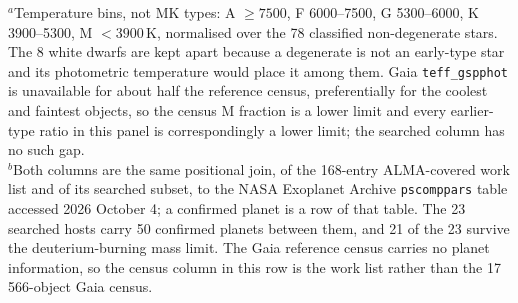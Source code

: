 \begin{table}
\smallskip
{\footnotesize $^{a}$Temperature bins, not MK types: A $\ge7500$, F 6000--7500, G 5300--6000, K 3900--5300, M $<3900$\,K, normalised over the 78 classified non-degenerate stars. The 8 white dwarfs are kept apart because a degenerate is not an early-type star and its photometric temperature would place it among them. Gaia \texttt{teff\_gspphot} is unavailable for about half the reference census, preferentially for the coolest and faintest objects, so the census M fraction is a lower limit and every earlier-type ratio in this panel is correspondingly a lower limit; the searched column has no such gap.\\ $^{b}$Both columns are the same positional join, of the 168-entry ALMA-covered work list and of its searched subset, to the NASA Exoplanet Archive \texttt{pscomppars} table accessed 2026 October 4; a confirmed planet is a row of that table. The 23 searched hosts carry 50 confirmed planets between them, and 21 of the 23 survive the deuterium-burning mass limit. The Gaia reference census carries no planet information, so the census column in this row is the work list rather than the 17\,566-object Gaia census.}
\end{table}
